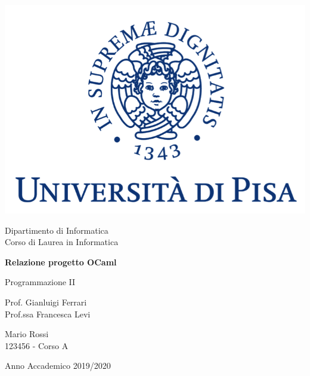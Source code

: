 \documentclass[10pt, italian, openany]{book}
\begin{document}
\begin{titlepage}
	\clearpage\thispagestyle{empty}
	\centering
	\vspace{1cm}

    \includegraphics[scale=0.60]{unipi-logo.png}
    
	{\normalsize \noindent Dipartimento di Informatica \\
	             Corso di Laurea in Informatica \par}
	
	\vspace{2cm}
	{\Huge \textbf{Relazione progetto OCaml} \par}
	\vspace{1cm}
	{\large Programmazione II}
	\vspace{5cm}

    \begin{minipage}[t]{0.47\textwidth}
    	{\large{ Prof. Gianluigi Ferrari\\ Prof.ssa Francesca Levi}}
    \end{minipage}\hfill\begin{minipage}[t]{0.47\textwidth}\raggedleft
    	{\large {Mario Rossi \\ 123456 - Corso A\\ }}
    \end{minipage}

    \vspace{4cm}

	{\normalsize Anno Accademico 2019/2020 \par}

	\pagebreak

\end{titlepage}
\end{document}
